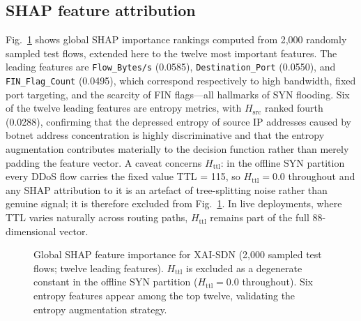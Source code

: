 ﻿\documentclass[review,12pt]{elsarticle}
\begin{document}
\subsection{SHAP feature attribution}
Fig.~\ref{fig:shap} shows global SHAP importance rankings computed from 2,000 randomly sampled test flows, extended here to the twelve most important features. The leading features are \texttt{Flow\_Bytes/s} (0.0585), \texttt{Destination\_Port} (0.0550), and \texttt{FIN\_Flag\_Count} (0.0495), which correspond respectively to high bandwidth, fixed port targeting, and the scarcity of FIN flags---all hallmarks of SYN flooding. Six of the twelve leading features are entropy metrics, with $H_{\mathrm{src}}$ ranked fourth (0.0288), confirming that the depressed entropy of source IP addresses caused by botnet address concentration is highly discriminative and that the entropy augmentation contributes materially to the decision function rather than merely padding the feature vector. A caveat concerns $H_{\mathrm{ttl}}$: in the offline SYN partition every DDoS flow carries the fixed value TTL = 115, so $H_{\mathrm{ttl}} = 0.0$ throughout and any SHAP attribution to it is an artefact of tree-splitting noise rather than genuine signal; it is therefore excluded from Fig.~\ref{fig:shap}. In live deployments, where TTL varies naturally across routing paths, $H_{\mathrm{ttl}}$ remains part of the full 88-dimensional vector.

\begin{figure}[!t]
\centering
{}
\caption{Global SHAP feature importance for XAI-SDN (2,000 sampled test flows; twelve leading features). $H_{\mathrm{ttl}}$ is excluded as a degenerate constant in the offline SYN partition ($H_{\mathrm{ttl}}=0.0$ throughout). Six entropy features appear among the top twelve, validating the entropy augmentation strategy.}
\label{fig:shap}
\end{figure}
\end{document}
